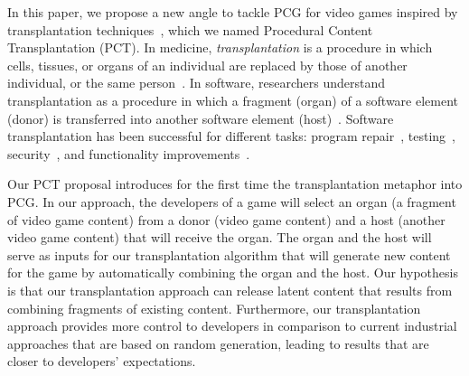 In this paper, we propose a new angle to tackle PCG for video games inspired by transplantation techniques~\cite{barr2015automated}, which we named Procedural Content Transplantation (PCT). In medicine, \textit{transplantation} is a procedure in which cells, tissues, or organs of an individual are replaced by those of another individual, or the same person~\cite{FARSHBAFNADI2023599}. In software, researchers understand transplantation as a procedure in which a fragment (organ) of a software element (donor) is transferred into another software element (host)~\cite{barr2015automated}. Software transplantation has been successful for different tasks: program repair~\cite{weimer2009automatically,sidiroglou2014automatic}, testing~\cite{zhang2017automated}, security~\cite{yang2017malware}, and functionality improvements~\cite{sidiroglou2017codecarboncopy}.

Our PCT proposal introduces for the first time the transplantation metaphor into PCG. In our approach, the developers of a game will select an organ (a fragment of video game content) from a donor (video game content) and a host (another video game content) that will receive the organ. The organ and the host will serve as inputs for our transplantation algorithm that will generate new content for the game by automatically combining the organ and the host. Our hypothesis is that our transplantation approach can release latent content that results from combining fragments of existing content. Furthermore, our transplantation approach provides more control to developers in comparison to current industrial approaches that are based on random generation, leading to results that are closer to developers' expectations.


